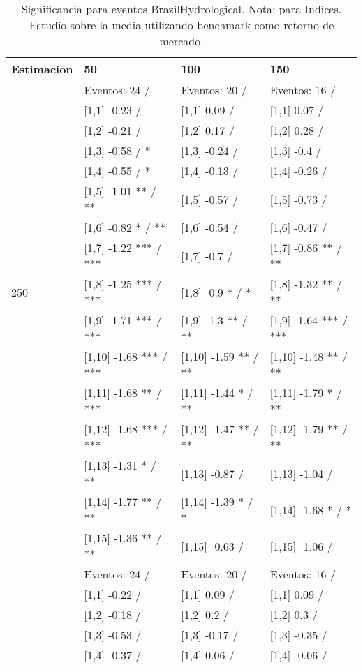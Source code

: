 \begin{table}

\caption{Significancia para eventos BrazilHydrological. Nota: para Indices. Estudio sobre la media utilizando benchmark como retorno de mercado.}
\centering
\begin{tabular}[t]{llll}
\toprule
Estimacion & 50 & 100 & 150\\
\midrule
 & Eventos:  24 / & Eventos:  20 / & Eventos:  16 /\\
 & {}[1,1] -0.23  / & {}[1,1] 0.09  / & {}[1,1] 0.07  /\\
 & {}[1,2] -0.21  / & {}[1,2] 0.17  / & {}[1,2] 0.28  /\\
 & {}[1,3] -0.58  / * & {}[1,3] -0.24  / & {}[1,3] -0.4  /\\
 & {}[1,4] -0.55  / * & {}[1,4] -0.13  / & {}[1,4] -0.26  /\\
\addlinespace
 & {}[1,5] -1.01 ** / ** & {}[1,5] -0.57  / & {}[1,5] -0.73  /\\
 & {}[1,6] -0.82 * / ** & {}[1,6] -0.54  / & {}[1,6] -0.47  /\\
 & {}[1,7] -1.22 *** / *** & {}[1,7] -0.7  / & {}[1,7] -0.86 ** / **\\
250 & {}[1,8] -1.25 *** / *** & {}[1,8] -0.9 * / * & {}[1,8] -1.32 ** / **\\
 & {}[1,9] -1.71 *** / *** & {}[1,9] -1.3 ** / ** & {}[1,9] -1.64 *** / ***\\
\addlinespace
 & {}[1,10] -1.68 *** / *** & {}[1,10] -1.59 ** / ** & {}[1,10] -1.48 ** / **\\
 & {}[1,11] -1.68 ** / *** & {}[1,11] -1.44 * / ** & {}[1,11] -1.79 * / **\\
 & {}[1,12] -1.68 *** / *** & {}[1,12] -1.47 ** / ** & {}[1,12] -1.79 ** / **\\
 & {}[1,13] -1.31 * / ** & {}[1,13] -0.87  / & {}[1,13] -1.04  /\\
 & {}[1,14] -1.77 ** / ** & {}[1,14] -1.39 * / * & {}[1,14] -1.68 * / *\\
\addlinespace
 & {}[1,15] -1.36 ** / ** & {}[1,15] -0.63  / & {}[1,15] -1.06  /\\
 & Eventos:  24 / & Eventos:  20 / & Eventos:  16 /\\
 & {}[1,1] -0.22  / & {}[1,1] 0.09  / & {}[1,1] 0.09  /\\
 & {}[1,2] -0.18  / & {}[1,2] 0.2  / & {}[1,2] 0.3  /\\
 & {}[1,3] -0.53  / & {}[1,3] -0.17  / & {}[1,3] -0.35  /\\
\addlinespace
 & {}[1,4] -0.37  / & {}[1,4] 0.06  / & {}[1,4] -0.06  /\\

\end{tabular}
\end{table}
